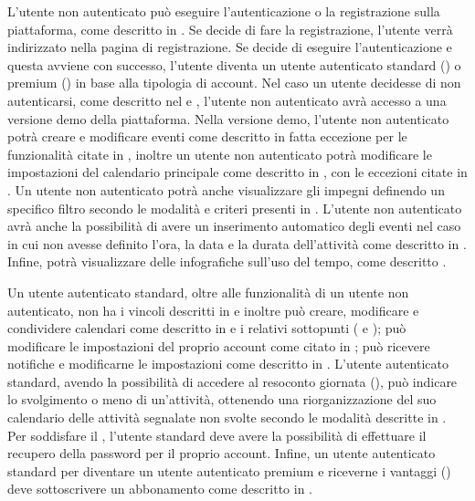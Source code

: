 \begin{listaPersonale}[DCO]{}
    L'utente non autenticato può eseguire l'autenticazione o la registrazione sulla piattaforma, come descritto in . Se decide di fare la registrazione, l'utente verrà indirizzato nella pagina di registrazione. Se decide di eseguire l'autenticazione e questa avviene con successo, l'utente diventa un utente autenticato standard () o premium () in base alla tipologia di account. Nel caso un utente decidesse di non autenticarsi, come descritto nel  e , l'utente non autenticato avrà accesso a una versione demo della piattaforma. Nella versione demo, l'utente non autenticato potrà creare e modificare eventi come descritto in  fatta eccezione per le funzionalità citate in , inoltre un utente non autenticato potrà modificare le impostazioni del calendario principale come descritto in , con le eccezioni citate in . Un utente non autenticato potrà anche visualizzare gli impegni definendo un specifico filtro secondo le modalità e criteri presenti in . L'utente non autenticato avrà anche la possibilità di avere un inserimento automatico degli eventi nel caso in cui non avesse definito l'ora, la data e la durata dell'attività come descritto in . Infine, potrà visualizzare delle infografiche sull'uso del tempo, come descritto .

    Un utente autenticato standard, oltre alle funzionalità di un utente non autenticato, non ha i vincoli descritti in  e inoltre può creare, modificare e condividere calendari come descritto in  e i relativi sottopunti ( e ); può modificare le impostazioni del proprio account come citato in ; può ricevere notifiche e modificarne le impostazioni come descritto in . L'utente autenticato standard, avendo la possibilità di accedere al resoconto giornata (), può indicare lo svolgimento o meno di un'attività, ottenendo una riorganizzazione del suo calendario delle attività segnalate non svolte secondo le modalità descritte in . Per soddisfare il , l'utente standard deve avere la possibilità di effettuare il recupero della password per il proprio account. Infine, un utente autenticato standard per diventare un utente autenticato premium e riceverne i vantaggi () deve sottoscrivere un abbonamento come descritto in .


\end{listaPersonale}
